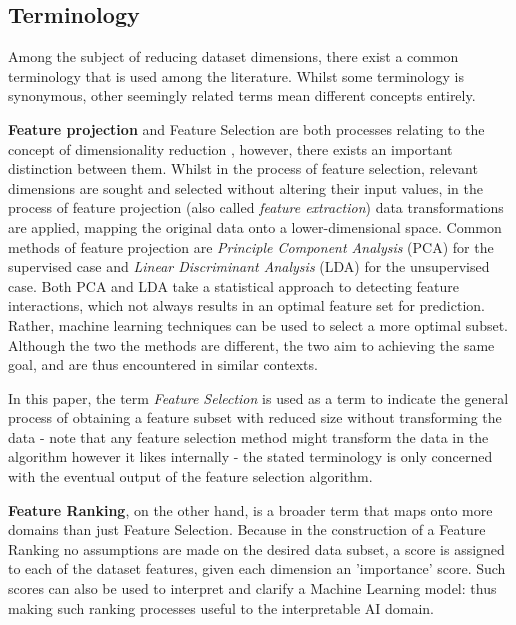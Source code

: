 \documentclass{article}
\begin{document}
\subsection{Terminology}
Among the subject of reducing dataset dimensions, there exist a common terminology that is used among the literature. Whilst some terminology is synonymous, other seemingly related terms mean different concepts entirely.


\textbf{Feature projection} and Feature Selection are both processes relating to the concept of dimensionality reduction \citep{cunningham_dimension_2007}, however, there exists an important distinction between them. Whilst in the process of feature selection, relevant dimensions are sought and selected without altering their input values, in the process of feature projection (also called \textit{feature extraction}) data transformations are applied, mapping the original data onto a lower-dimensional space. Common methods of feature projection are \textit{Principle Component Analysis} (PCA) for the supervised case and \textit{Linear Discriminant Analysis} (LDA) for the unsupervised case. Both PCA and LDA take a statistical approach to detecting feature interactions, which not always results in an optimal feature set for prediction. Rather, machine learning techniques can be used to select a more optimal subset. Although the two the methods are different, the two aim to achieving the same goal, and are thus encountered in similar contexts.

In this paper, the term \textit{Feature Selection} is used as a term to indicate the general process of obtaining a feature subset with reduced size without transforming the data - note that any feature selection method might transform the data in the algorithm however it likes internally - the stated terminology is only concerned with the eventual output of the feature selection algorithm.

\textbf{Feature Ranking}, on the other hand, is a broader term that maps onto more domains than just Feature Selection. Because in the construction of a Feature Ranking no assumptions are made on the desired data subset, a score is assigned to each of the dataset features, given each dimension an 'importance' score. Such scores can also be used to interpret and clarify a Machine Learning model: thus making such ranking processes useful to the interpretable AI domain.
\end{document}
